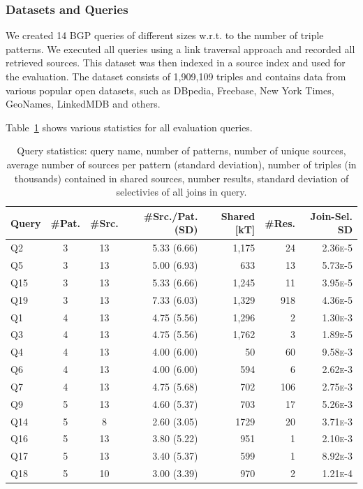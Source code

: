 \subsubsection{Datasets and Queries}

We created 14 BGP queries of different sizes w.r.t. to the number of
triple patterns. We executed all queries using a link traversal
approach and recorded all retrieved sources. This dataset was then
indexed in a source index and used for the evaluation. The dataset
consists of 1,909,109 triples and contains data from various popular
open datasets, such as DBpedia, Freebase, New York Times, GeoNames,
LinkedMDB and others. 


Table~\ref{tab:queries} shows various statistics for all evaluation
queries.

\begin{table}[htb]
  \centering
  \begin{tabular}{l|c|c|r|r|r|r}
    Query & \#Pat. & \#Src. & \#Src./Pat. (SD) & Shared [kT] & \#Res. & Join-Sel. SD \\ 
    \hline

    Q2  & 3 & 13 & 5.33 (6.66) & 1,175 & 24  & 2.36\textsc{e}-5 \\
    Q5  & 3 & 13 & 5.00 (6.93) & 633   & 13  & 5.73\textsc{e}-5 \\
    Q15 & 3 & 13 & 5.33 (6.66) & 1,245 & 11  & 3.95\textsc{e}-5 \\
    Q19 & 3 & 13 & 7.33 (6.03) & 1,329 & 918 & 4.36\textsc{e}-5 \\
    \hline
    Q1  & 4 & 13 & 4.75 (5.56) & 1,296 & 2   & 1.30\textsc{e}-3 \\
    Q3  & 4 & 13 & 4.75 (5.56) & 1,762 & 3   & 1.89\textsc{e}-5 \\
    Q4  & 4 & 13 & 4.00 (6.00) & 50    & 60  & 9.58\textsc{e}-3 \\
    Q6  & 4 & 13 & 4.00 (6.00) & 594   & 6   & 2.62\textsc{e}-3 \\
    Q7  & 4 & 13 & 4.75 (5.68) & 702   & 106 & 2.75\textsc{e}-3 \\
    \hline
    Q9  & 5 & 13 & 4.60 (5.37) & 703   & 17  & 5.26\textsc{e}-3 \\
    Q14 & 5 & 8  & 2.60 (3.05) & 1729  & 20  & 3.71\textsc{e}-3 \\
    Q16 & 5 & 13 & 3.80 (5.22) & 951   & 1   & 2.10\textsc{e}-3 \\
    Q17 & 5 & 13 & 3.40 (5.37) & 599   & 1   & 8.92\textsc{e}-3 \\
    Q18 & 5 & 10 & 3.00 (3.39) & 970   & 2   & 1.21\textsc{e}-4 \\
  \end{tabular}
  \caption{Query statistics: query name, number of patterns, number of unique sources, average number of sources per pattern (standard deviation), number of triples (in thousands) contained in shared sources, number results, standard deviation of selectivies of all joins in query.}
  \label{tab:queries}
\end{table}

